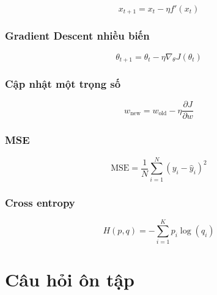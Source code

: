 \documentclass[12pt,a4paper]{report}
\begin{document}
\[
    x_{t+1}
    =
    x_t
    -
    \eta f'(x_t)
\]

\subsection*{Gradient Descent nhiều biến}

\[
    \theta_{t+1}
    =
    \theta_t
    -
    \eta \nabla_{\theta}J(\theta_t)
\]

\subsection*{Cập nhật một trọng số}

\[
    w_{\text{new}}
    =
    w_{\text{old}}
    -
    \eta
    \frac{\partial J}{\partial w}
\]

\subsection*{MSE}

\[
    \text{MSE}
    =
    \frac{1}{N}
    \sum_{i=1}^{N}
    (y_i-\hat{y}_i)^2
\]

\subsection*{Cross entropy}

\[
    H(p,q)
    =
    -\sum_{i=1}^{K}
    p_i\log(q_i)
\]

\chapter{Câu hỏi ôn tập}
\end{document}
